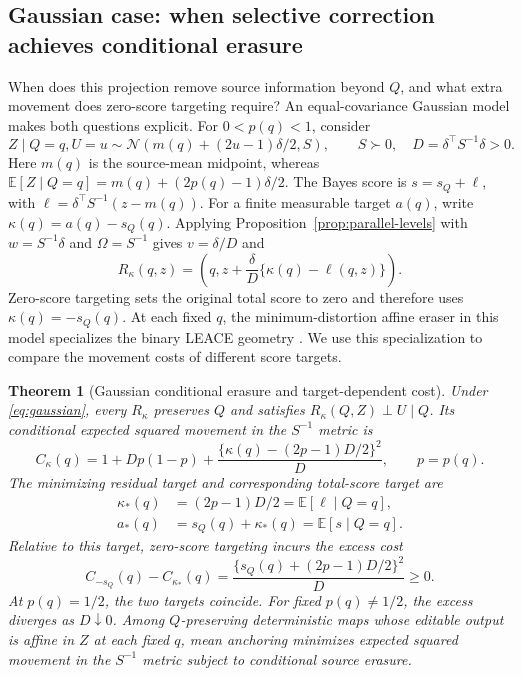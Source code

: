 \documentclass{article}
\theoremstyle{plain}
\newtheorem{theorem}{Theorem}
\theoremstyle{definition}
\newcommand{\E}{\mathbb E}
\newcommand{\sg}{s_Q}
\begin{document}
\subsection{Gaussian case: when selective correction achieves conditional erasure}
When does this projection remove source information beyond $Q$, and what
extra movement does zero-score targeting require? An equal-covariance
Gaussian model makes both questions explicit. For $0<p(q)<1$, consider
\begin{equation}
 Z\mid Q=q,U=u\sim\mathcal N(m(q)+(2u-1)\delta/2,S),\qquad
 S\succ0,\quad D=\delta^\top S^{-1}\delta>0.
 \label{eq:gaussian}
\end{equation}
Here $m(q)$ is the source-mean midpoint, whereas
$\E[Z\mid Q=q]=m(q)+(2p(q)-1)\delta/2$. The Bayes score is $s=\sg+\ell$,
with $\ell=\delta^\top S^{-1}(z-m(q))$. For a finite measurable target
$a(q)$, write $\kappa(q)=a(q)-\sg(q)$. Applying
Proposition~\ref{prop:parallel-levels} with $w=S^{-1}\delta$ and
$\Omega=S^{-1}$ gives $v=\delta/D$ and
\begin{equation}
 R_\kappa(q,z)=\left(q,z+\frac{\delta}{D}\{\kappa(q)-\ell(q,z)\}\right).
 \label{eq:gaussian-map}
\end{equation}
Zero-score targeting sets the original total score to zero and therefore uses
$\kappa(q)=-\sg(q)$. At each fixed $q$, the minimum-distortion affine eraser
in this model specializes the binary LEACE geometry \citep{belrose2023}.
We use this specialization to compare the movement costs of different score targets.

\begin{theorem}[Gaussian conditional erasure and target-dependent cost]
\label{thm:compensation}
Under \eqref{eq:gaussian}, every $R_\kappa$ preserves $Q$ and satisfies
$R_\kappa(Q,Z)\perp U\mid Q$. Its conditional expected squared movement
in the $S^{-1}$ metric is
\begin{equation}
 C_\kappa(q)=1+Dp(1-p)
       +\frac{\{\kappa(q)-(2p-1)D/2\}^2}{D},\qquad p=p(q).
 \label{eq:gauge-cost}
\end{equation}
The minimizing residual target and corresponding total-score target are
\[
 \begin{aligned}
 \kappa_*(q)&=(2p-1)D/2=\E[\ell\mid Q=q],\\
 a_*(q)&=\sg(q)+\kappa_*(q)=\E[s\mid Q=q].
 \end{aligned}
\]
Relative to this target, zero-score targeting incurs the excess cost
\begin{equation}
 C_{-\sg}(q)-C_{\kappa_*}(q)
 =\frac{\{\sg(q)+(2p-1)D/2\}^2}{D}\ge0.
 \label{eq:compensation}
\end{equation}
At $p(q)=1/2$, the two targets coincide. For fixed $p(q)\ne1/2$, the excess
diverges as $D\downarrow0$. Among $Q$-preserving deterministic maps whose
editable output is affine in $Z$ at each fixed $q$, mean anchoring minimizes
expected squared movement in the $S^{-1}$ metric subject to conditional source erasure.
\end{theorem}
\end{document}
